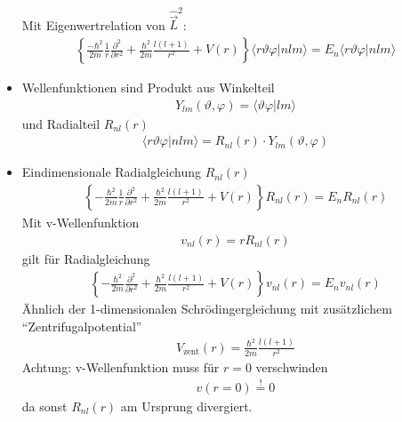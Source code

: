 \documentclass[10pt,article,colorback,accentcolor=tud9d]{scrartcl}
\begin{document}
\begin{itemize}
\begin{align}
    \end{align}
    Mit Eigenwertrelation von $\hat{\vec{L}}^2$:
    \begin{align}
    \left\{\frac{-\hbar^2}{2m}\frac{1}{r}\frac{\partial^2}{\partial r^2}+\frac{\hbar^2}{2m}\frac{l(l+1)}{r^2}+V(r)\right\}\langle r\vartheta\varphi|nlm\rangle=E_n\langle r\vartheta\varphi|nlm\rangle
    \end{align}
  \item Wellenfunktionen sind Produkt aus Winkelteil 
    \begin{align}
    Y_{lm}(\vartheta,\varphi)=\langle\vartheta\varphi|lm\rangle
    \end{align}
    und Radialteil $R_{nl}(r)$
    \begin{align}
   \langle r\vartheta\varphi|nlm\rangle=R_{nl}(r)\cdot Y_{lm}(\vartheta,\varphi)
    \end{align}
  \item Eindimensionale Radialgleichung $R_{nl}(r)$
    \begin{align}
    \left\{-\frac{\hbar^2}{2m}\frac{1}{r}\frac{\partial^2}{\partial r^2}+\frac{\hbar^2}{2m}\frac{l(l+1)}{r^2}+V(r)\right\}R_{nl}(r)=E_nR_{nl}(r)
    \end{align}
    Mit v-Wellenfunktion
    \begin{align}
    v_{nl}(r)=rR_{nl}(r)
    \end{align}
    gilt für Radialgleichung
    \begin{align}
    \left\{-\frac{\hbar^2}{2m}\frac{\partial^2}{\partial r^2}+\frac{\hbar^2}{2m}\frac{l(l+1)}{r^2}+V(r)\right\}v_{nl}(r)=E_nv_{nl}(r)
    \end{align}
    Ähnlich der 1-dimensionalen Schrödingergleichung mit zusätzlichem "`Zentrifugalpotential"'
    \begin{align}
    V_\text{zent}(r)=\frac{\hbar^2}{2m}\frac{l(l+1)}{r^2}
    \end{align}
    Achtung: v-Wellenfunktion muss für $r=0$ verschwinden
    \begin{align}
    v(r=0)\stackrel{!}{=}0
    \end{align}
    da sonst $R_{nl}(r)$ am Ursprung divergiert.
\end{itemize}
\end{document}
